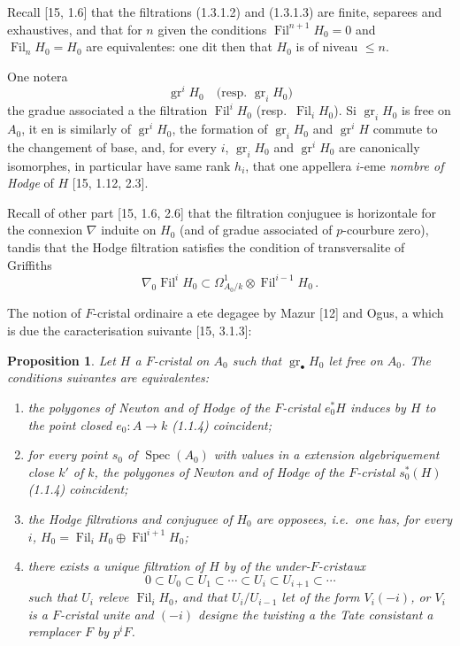 \documentclass[12pt,a4paper]{article}
\theoremstyle{plain}
\newtheorem{proposition}[theorem]{Proposition}
\theoremstyle{definition}
\theoremstyle{remark}
\DeclareMathOperator{\Spec}{Spec}
\DeclareMathOperator{\gr}{gr}
\DeclareMathOperator{\Fil}{Fil}
\begin{document}
Recall [15, 1.6] that the filtrations (1.3.1.2) and (1.3.1.3) are finite, separees and exhaustives, and that for $n$ given the conditions $\Fil^{n+1}H_0 = 0$ and $\Fil_nH_0 = H_0$ are equivalentes: one dit then that $H_0$ is of niveau $\leq n$.

One notera
\begin{equation}\label{eq:1.3.1.5}
\gr^iH_0 \quad \text{(resp.\ } \gr_iH_0\text{)}
\end{equation}
the gradue associated a the filtration $\Fil^iH_0$ (resp.\ $\Fil_iH_0$). Si $\gr_iH_0$ is free on $A_0$, it en is similarly of $\gr^iH_0$, the formation of $\gr_iH_0$ and $\gr^iH$ commute to the changement of base, and, for every $i$, $\gr_iH_0$ and $\gr^iH_0$ are canonically isomorphes, in particular have same rank $h_i$, that one appellera $i$-eme \emph{nombre of Hodge} of $H$ [15, 1.12, 2.3].

Recall of other part [15, 1.6, 2.6] that the filtration conjuguee is horizontale for the connexion $\nabla$ induite on $H_0$ (and of gradue associated of $p$-courbure zero), tandis that the Hodge filtration satisfies the condition of transversalite of Griffiths
\begin{equation}\label{eq:1.3.1.6}
\nabla_0\Fil^iH_0 \subset \Omega^1_{A_0/k} \otimes \Fil^{i-1}H_0\,.
\end{equation}

The notion of $F$-cristal ordinaire a ete degagee by Mazur [12] and Ogus, a which is due the caracterisation suivante [15, 3.1.3]:

\begin{proposition}\label{prop:1.3.2}
Let $H$ a $F$-cristal on $A_0$ such that $\gr_\bullet H_0$ let free on $A_0$. The conditions suivantes are equivalentes:
\begin{enumerate}[label=(\roman*)]
\item the polygones of Newton and of Hodge of the $F$-cristal $e_0^*H$ induces by $H$ to the point closed $e_0 : A \to k$ (1.1.4) coincident;
\item[(i$'$)] for every point $s_0$ of $\Spec(A_0)$ with values in a extension algebriquement close $k'$ of $k$, the polygones of Newton and of Hodge of the $F$-cristal $s_0^*(H)$ (1.1.4) coincident;
\item the Hodge filtrations and conjuguee of $H_0$ are opposees, i.e.\ one has, for every $i$, $H_0 = \Fil_iH_0 \oplus \Fil^{i+1}H_0$;
\item there exists a unique filtration of $H$ by of the under-$F$-cristaux
\begin{equation}\label{eq:1.3.2.1}
0 \subset U_0 \subset U_1 \subset \cdots \subset U_i \subset U_{i+1} \subset \cdots
\end{equation}
such that $U_i$ releve $\Fil_iH_0$, and that $U_i/U_{i-1}$ let of the form $V_i(-i)$, or $V_i$ is a $F$-cristal unite and $(-i)$ designe the twisting a the Tate consistant a remplacer $F$ by $p^iF$.
\end{enumerate}
\end{proposition}
\end{document}
